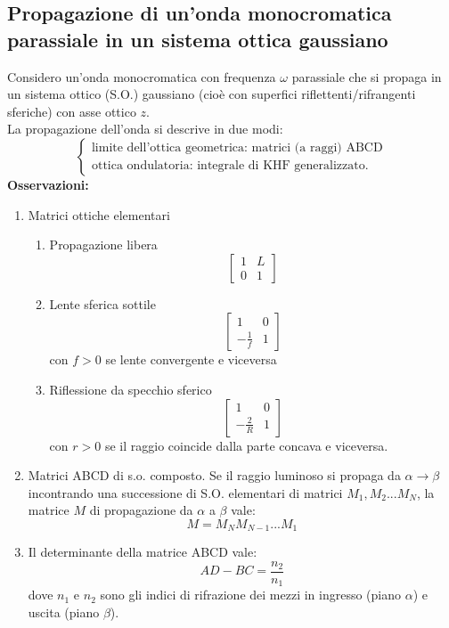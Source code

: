\documentclass{book}
\def \w {\omega}
\theoremstyle{remark}
\begin{document}
\subsection{Propagazione di un'onda monocromatica parassiale in un sistema ottica gaussiano}
Considero un'onda monocromatica con frequenza $\w$ parassiale che si propaga in un sistema ottico (S.O.) gaussiano (cioè con superfici riflettenti/rifrangenti sferiche) con asse ottico $z$.\\
La propagazione dell'onda si descrive in due modi:
\begin{equation*}
\begin{cases}
\text{limite dell'ottica geometrica: matrici (a raggi) ABCD}\\
\text{ottica ondulatoria: integrale di KHF generalizzato.}
\end{cases}
\end{equation*}
\textbf{Osservazioni:}\\
\begin{enumerate}
\item Matrici ottiche elementari
\begin{enumerate}
\item Propagazione libera
\[
\begin{bmatrix}
1	&	L\\
0	&	1
\end{bmatrix}
\]
\item Lente sferica sottile
\[
\begin{bmatrix}
1	&	0\\
-\frac{1}{f}	&	1
\end{bmatrix}
\]
con $f > 0$ se lente convergente e viceversa
\item Riflessione da specchio sferico
\[
\begin{bmatrix}
1	&	0\\
-\frac{2}{R}	&	1
\end{bmatrix}
\]
con $r >0$ se il raggio coincide dalla parte concava e viceversa.
\end{enumerate}
\item Matrici ABCD di s.o. composto. Se il raggio luminoso si propaga da $\alpha \rightarrow \beta$ incontrando una successione di S.O. elementari di matrici $M_1, M_2 ... M_N$, la matrice $M$ di propagazione da $\alpha$ a $\beta$ vale:
\begin{equation*}
M = M_NM_{N-1}...M_1
\end{equation*}
\item Il determinante della matrice ABCD vale:
\begin{equation*}
AD - BC = \frac{n_2}{n_1}
\end{equation*}
dove $n_1$ e $n_2$ sono gli indici di rifrazione dei mezzi in ingresso (piano $\alpha$) e uscita (piano $\beta$).
\end{enumerate}
\end{document}
